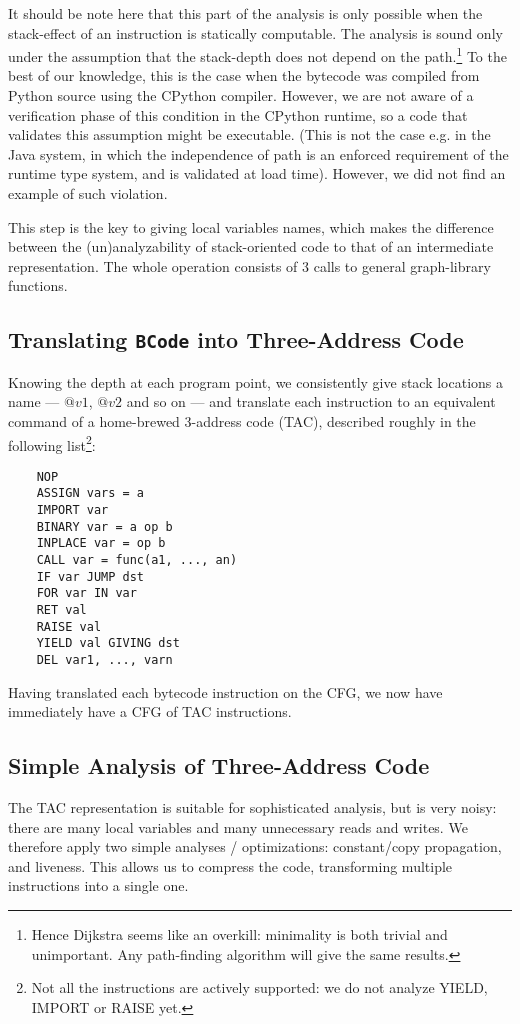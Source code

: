 \documentclass[a4paper]{article}
\begin{document}
It should be note here that this part of the analysis is only possible when the stack-effect of an instruction is statically computable. The analysis is sound only under the assumption that the stack-depth does not depend on the path.\footnote{Hence Dijkstra seems like an overkill: minimality is both trivial and unimportant. Any path-finding algorithm will give the same results.} To the best of our knowledge, this is the case when the bytecode was compiled from Python source using the CPython compiler. However, we are not aware of a verification phase of this condition in the CPython runtime, so a code that validates this assumption might be executable. (This is not the case e.g. in the Java system, in which the independence of path is an enforced requirement of the runtime type system, and is validated at load time). However, we did not find an example of such violation.

This step is the key to giving local variables names, which makes the difference between the (un)analyzability of stack-oriented code to that of an intermediate representation. The whole operation consists of 3 calls to general graph-library functions.

\subsection{Translating \texttt{BCode} into Three-Address Code}

Knowing the depth at each program point, we consistently give stack locations a name --- $@v1$, $@v2$ and so on --- and translate each instruction to an equivalent command of a home-brewed 3-address code (TAC), described roughly in the following list\footnote{Not all the instructions are actively supported: we do not analyze YIELD, IMPORT or RAISE yet.}:
\begin{lstlisting}
    NOP
    ASSIGN vars = a
    IMPORT var
    BINARY var = a op b
    INPLACE var = op b
    CALL var = func(a1, ..., an)
    IF var JUMP dst 
    FOR var IN var
    RET val
    RAISE val
    YIELD val GIVING dst
    DEL var1, ..., varn
\end{lstlisting}

Having translated each bytecode instruction on the CFG, we now have immediately have a CFG of TAC instructions.

\subsection{Simple Analysis of Three-Address Code}
The TAC representation is suitable for sophisticated analysis, but is very noisy: there are many local variables and many unnecessary reads and writes. We therefore apply two simple analyses / optimizations: constant/copy propagation, and liveness. This allows us to compress the code, transforming multiple instructions into a single one.
\end{document}
